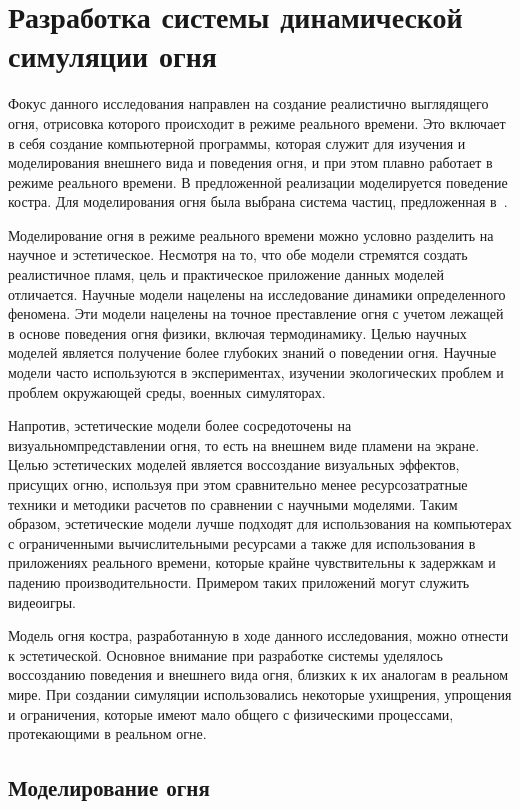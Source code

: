 \chapter{Разработка системы динамической симуляции огня}%
\label{chap:implementation}

Фокус данного исследования направлен на создание реалистично выглядящего огня,
отрисовка которого происходит в режиме реального времени. Это включает в себя
создание компьютерной программы, которая служит для изучения и моделирования
внешнего вида и поведения огня, и при этом плавно работает в режиме реального
времени. В предложенной реализации моделируется поведение костра. Для
моделирования огня была выбрана система частиц, предложенная
в~\cite{reewes1983}.

Моделирование огня в режиме реального времени можно условно разделить на научное
и эстетическое. Несмотря на то, что обе модели стремятся создать реалистичное
пламя, цель и практическое приложение данных моделей отличается. Научные модели
нацелены на исследование динамики определенного феномена. Эти модели нацелены на
точное преставление огня с учетом лежащей в основе поведения огня физики,
включая термодинамику. Целью научных моделей является получение более глубоких
знаний о поведении огня. Научные модели часто используются в экспериментах,
изучении экологических проблем и проблем окружающей среды, военных симуляторах.

Напротив, эстетические модели более сосредоточены на
визуальном\break{}представлении огня, то есть на внешнем виде пламени на экране.
Целью эстетических моделей является воссоздание визуальных эффектов, присущих
огню, используя при этом сравнительно менее ресурсозатратные техники и методики
расчетов по сравнении с научными моделями. Таким образом, эстетические модели
лучше подходят для использования на компьютерах с ограниченными вычислительными
ресурсами а также для использования в приложениях реального времени, которые
крайне чувствительны к задержкам и падению производительности. Примером таких
приложений могут служить видеоигры.

Модель огня костра, разработанную в ходе данного исследования, можно отнести к
эстетической. Основное внимание при разработке системы уделялось воссозданию
поведения и внешнего вида огня, близких к их аналогам в реальном мире. При
создании симуляции использовались некоторые ухищрения, упрощения и ограничения,
которые имеют мало общего с физическими процессами, протекающими в реальном
огне.

\section{Моделирование огня}

